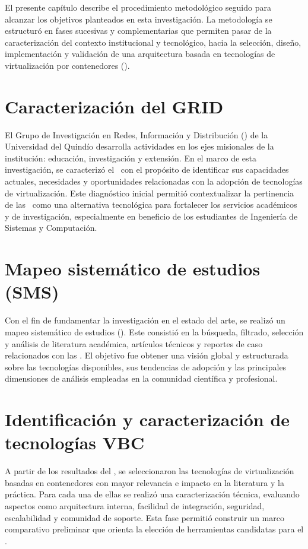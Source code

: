 \label{cap:desarrolloMetodologico}
El presente capítulo describe el procedimiento metodológico seguido para alcanzar los objetivos planteados en esta investigación. La metodología se estructuró en fases sucesivas y complementarias que permiten pasar de la caracterización del contexto institucional y tecnológico, hacia la selección, diseño, implementación y validación de una arquitectura basada en tecnologías de virtualización por contenedores (\VBC).

\section{Caracterización del GRID}
El Grupo de Investigación en Redes, Información y Distribución (\GRID) de la Universidad del Quindío desarrolla actividades en los ejes misionales de la institución: educación, investigación y extensión. En el marco de esta investigación, se caracterizó el \GRID\ con el propósito de identificar sus capacidades actuales, necesidades y oportunidades relacionadas con la adopción de tecnologías de virtualización. Este diagnóstico inicial permitió contextualizar la pertinencia de las \VBC\ como una alternativa tecnológica para fortalecer los servicios académicos y de investigación, especialmente en beneficio de los estudiantes de Ingeniería de Sistemas y Computación.

\section{Mapeo sistemático de estudios (SMS)}
Con el fin de fundamentar la investigación en el estado del arte, se realizó un mapeo sistemático de estudios (\SMS). Este consistió en la búsqueda, filtrado, selección y análisis de literatura académica, artículos técnicos y reportes de caso relacionados con las \VBC. El objetivo fue obtener una visión global y estructurada sobre las tecnologías disponibles, sus tendencias de adopción y las principales dimensiones de análisis empleadas en la comunidad científica y profesional.

\section{Identificación y caracterización de tecnologías VBC}
A partir de los resultados del \SMS, se seleccionaron las tecnologías de virtualización basadas en contenedores con mayor relevancia e impacto en la literatura y la práctica. Para cada una de ellas se realizó una caracterización técnica, evaluando aspectos como arquitectura interna, facilidad de integración, seguridad, escalabilidad y comunidad de soporte. Esta fase permitió construir un marco comparativo preliminar que orienta la elección de herramientas candidatas para el \GRID.

